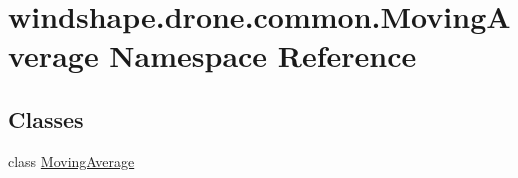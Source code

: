 \hypertarget{namespacewindshape_1_1drone_1_1common_1_1_moving_average}{}\section{windshape.\+drone.\+common.\+Moving\+Average Namespace Reference}
\label{namespacewindshape_1_1drone_1_1common_1_1_moving_average}
\subsection*{Classes}
\begin{DoxyCompactItemize}
\item 
class \mbox{\hyperlink{classwindshape_1_1drone_1_1common_1_1_moving_average_1_1_moving_average}{Moving\+Average}}
\end{DoxyCompactItemize}
